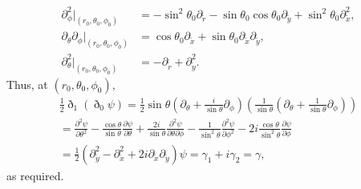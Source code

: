 \documentclass[11pt]{article} %
\begin{document}
\begin{align*}
    \partial_\phi^2|_{(r_0,\theta_0,\phi_0)}&=-\sin^2\theta_0\partial_{\tilde r}-\sin\theta_0\cos\theta_0\partial_{\tilde y}+\sin^2\theta_0\partial^2_{\tilde x},\\
    \partial_\theta\partial_\phi|_{(r_0,\theta_0,\phi_0)}&=\cos\theta_0\partial_{\tilde x}+\sin\theta_0\partial_{\tilde x}\partial_{\tilde y},\\
    \partial_\theta^2|_{(r_0,\theta_0,\phi_0)}&=-\partial_{\tilde r}+\partial^2_{\tilde y}.
\end{align*}
Thus, at $(r_0, \theta_0, \phi_0)$,
\begin{gather*}
    \frac{1}{2}\eth_1(\eth_0\psi) = \frac{1}{2}\sin\theta(\partial_\theta+\frac{i}{\sin\theta}\partial_\phi)(\frac{1}{\sin\theta}(\partial_\theta+\frac{1}{\sin\theta}\partial_\phi))\\
    =\frac{\partial^2 \psi}{\partial \theta^2} - \frac{\cos\theta}{\sin\theta} \frac{\partial \psi}{\partial \theta} + \frac{2 i}{\sin\theta} \frac{\partial^2 \psi}{\partial \theta \partial \phi} - \frac{1}{\sin^2\theta} \frac{\partial^2 \psi}{\partial \phi^2} - 2 i \frac{\cos\theta}{\sin^2\theta} \frac{\partial \psi}{\partial \phi}\\
    =\frac{1}{2}(\partial_{\tilde y}^2 - \partial_{\tilde x}^2 + 2i\partial_{\tilde x}\partial_{\tilde y})\psi
    =\gamma_1 + i\gamma_2 = \gamma,
\end{gather*}
as required.

\end{document}
